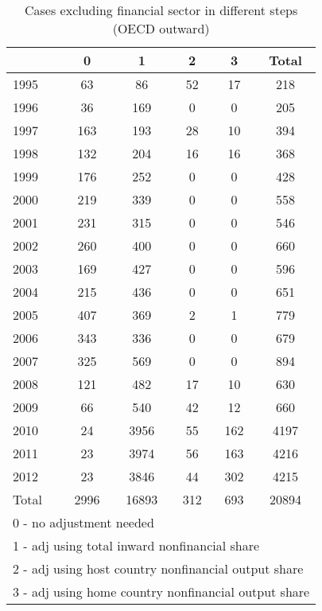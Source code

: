 \begin{table}[htbp]\centering
\caption{Cases excluding financial sector in different steps (OECD outward)}
\begin{tabular}{l*{5}{c}}
\toprule
            &           0&           1&           2&           3&       Total\\
\midrule
1995        &          63&          86&          52&          17&         218\\
1996        &          36&         169&           0&           0&         205\\
1997        &         163&         193&          28&          10&         394\\
1998        &         132&         204&          16&          16&         368\\
1999        &         176&         252&           0&           0&         428\\
2000        &         219&         339&           0&           0&         558\\
2001        &         231&         315&           0&           0&         546\\
2002        &         260&         400&           0&           0&         660\\
2003        &         169&         427&           0&           0&         596\\
2004        &         215&         436&           0&           0&         651\\
2005        &         407&         369&           2&           1&         779\\
2006        &         343&         336&           0&           0&         679\\
2007        &         325&         569&           0&           0&         894\\
2008        &         121&         482&          17&          10&         630\\
2009        &          66&         540&          42&          12&         660\\
2010        &          24&        3956&          55&         162&        4197\\
2011        &          23&        3974&          56&         163&        4216\\
2012        &          23&        3846&          44&         302&        4215\\
Total       &        2996&       16893&         312&         693&       20894\\
\bottomrule
\multicolumn{6}{l}{\footnotesize 0 - no adjustment needed}\\
\multicolumn{6}{l}{\footnotesize 1 - adj using total inward nonfinancial share}\\
\multicolumn{6}{l}{\footnotesize 2 - adj using host country nonfinancial output share}\\
\multicolumn{6}{l}{\footnotesize 3 - adj using home country nonfinancial output share}\\
\end{tabular}
\end{table}
